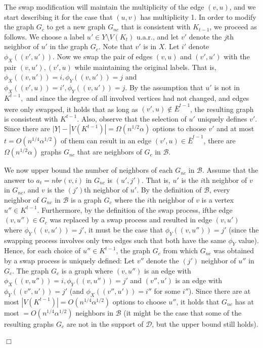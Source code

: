 \documentclass{article}
\newcommand{\calB}{{\mathcal{B}}}
\newcommand{\calD}{{\mathcal{D}}}
\newenvironment{proof}{\smallskip\noindent{\bf Proof:}}%
        {\hspace*{\fill}$\Box$\par}
\begin{document}
\begin{proof}
    The swap modification will maintain the multiplicity of the edge $(v,u)$, and we start describing it for  the case that $(u,v)$ has multiplicity 1.  In order to modify the graph $G_c$ to get a new graph $G_{nc}$ that is consistent with $K_{t-1}$, we proceed as follows.
    We choose a label  $u'\in Y\setminus V(K_t)$ u.a.r., and let $v'$ denote the $j$th neighbor of $u'$ in the graph $G_{c}$. Note that $v'$ is in $X$. Let $i'$ denote $\phi_X((v',u'))$. Now we swap the pair of  edges $(v,u)$
    and $(v',u')$   with the pair  $(v,u'), (v',u)$  while maintaining the original labels. That is, $\phi_X((v,u'))=i, \phi_Y((v,u'))=j$ and $\phi_X((v',u))=i', \phi_Y((v,u'))=j$.
    By the assumption that $u'$ is not in $K^{t-1},$
    and since the degree of all involved vertices had not changed, and edges were only swapped,
    it holds that as long as $(v',u)\notin \bar{E}^{t-1}$, the resulting  graph is consistent with $K^{t-1}$.
    Also, observe that the selection of $u'$ uniquely defines $v'$.
    Since there are $|Y|-|V(K^{t-1})|=\Omega(n^{1/2}\alpha)$ options to choose $v'$ and at most $t=O(n^{1/4}\alpha^{1/2})$ of them can result in an edge $(v',u)\in  \bar{E}^{t-1}$, there are $\Omega(n^{1/2}\alpha)$ graphs $G_{nc}$ that are neighbors of $G_{c}$ in $\calB$.

    We now upper bound the number of neighbors of each $G_{nc}$ in $\calB$.
    Assume that the answer to $a_t=nbr(v,i)$ in $G_{nc}$ is $(u',j')$. That is, $u'$ is the $i$th neighbor of $v$ in $G_{nc}$, and $v$ is the $(j')$th neighbor of $u'$.
      By the definition of $\calB$, every neighbor of $G_{nc}$ in $\calB$ is a graph $G_{c}$ where the $i$th neighbor of $v$ is a vertex $u''\in K^{t-1}$. Furthermore, by the definition of the swap process, ifthe edge $(v,u'')\in G_c$ was replaced by a swap process and resulted in edge $(v,u')$ where $\phi_Y((v,u'))=j'$, it must be the case that $\phi_{Y}((v,u''))=j'$ (since the swapping process  involves only two edges such that both have the same $\phi_Y$ value). Hence, for each choice of $u''\in K^{t-1}$, the graph $G_c$ from which $G_{nc}$ was obtained by a swap process is uniquely defined:
      Let $v''$ denote the $(j')$ neighbor of $u''$ in $G_c$.
      The graph $G_c$ is a graph where
      $(v,u'')$ is an edge with $\phi_{X}((v,u''))=i, \phi_Y((v,u''))=j'$ and $(v'', u')$ is an edge with $\phi_Y((v'', u'))=j'$ (and $\phi_X((v'', u'))=i''$ for some $i''$). Since there are at most $|V(K^{t-1})|=O(n^{1/4}\alpha^{1/2})$ options to choose $u''$, it holds that $G_{nc}$ has at most $=O(n^{1/4}\alpha^{1/2})$ neighbors in $\calB$ (it might be the case that some of the resulting graphs $G_c$ are not in the support of $\calD$, but the upper bound still holds).


\end{proof}
\end{document}
